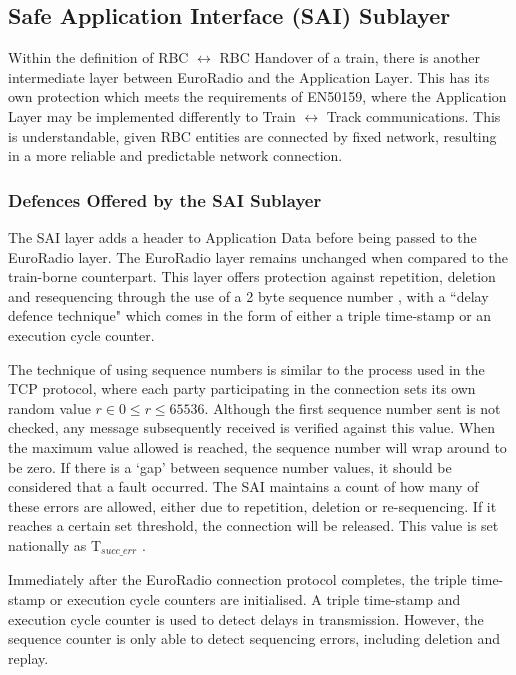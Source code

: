 \documentclass[twoside,11pt,a4paper]{article}
\begin{document}
\subsection{Safe Application Interface (SAI) Sublayer}
Within the definition of RBC $\leftrightarrow$ RBC Handover of a train, there is another intermediate layer between EuroRadio and the Application Layer. This has its own protection which meets the requirements of EN50159, where the Application Layer may be implemented differently to Train $\leftrightarrow$ Track communications. This is understandable, given RBC entities are connected by fixed network, resulting in a more reliable and predictable network connection.

\subsubsection{Defences Offered by the SAI Sublayer}
The SAI layer adds a header to Application Data before being passed to the EuroRadio layer. The EuroRadio layer remains unchanged when compared to the train-borne counterpart. This layer offers protection against repetition, deletion and resequencing through the use of a 2 byte sequence number \citep[p. 21]{SUBSET-098}, with a ``delay defence technique" \citep[p. 15]{SUBSET-098} which comes in the form of either a triple time-stamp or an execution cycle counter.

The technique of using sequence numbers is similar to the process used in the TCP protocol, where each party participating in the connection sets its own random value $r \in 0 \leq r \leq 65536$. Although the first sequence number sent is not checked, any message subsequently received is verified against this value. When the maximum value allowed is reached, the sequence number will wrap around to be zero. If there is a `gap' between sequence number values, it should be considered that a fault occurred. The SAI maintains a count of how many of these errors are allowed, either due to repetition, deletion or re-sequencing. If it reaches a certain set threshold, the connection will be released. This value is set nationally as T$_{succ\_err}$ \citep[Section 5.4.10]{SUBSET-098}.

Immediately after the EuroRadio connection protocol completes, the triple time-stamp or execution cycle counters are initialised. A triple time-stamp and execution cycle counter is used to detect delays in transmission. However, the sequence counter is only able to detect sequencing errors, including deletion and replay.
\end{document}

